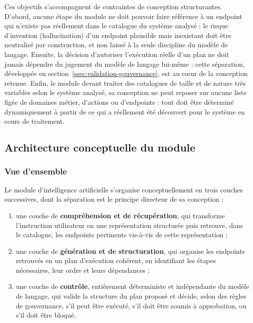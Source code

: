 Ces objectifs s'accompagnent de contraintes de conception structurantes. D'abord, aucune étape du module ne doit pouvoir faire référence à un endpoint qui n'existe pas réellement dans le catalogue du système analysé : le risque d'invention (hallucination) d'un endpoint plausible mais inexistant doit être neutralisé par construction, et non laissé à la seule discipline du modèle de langage. Ensuite, la décision d'autoriser l'exécution réelle d'un plan ne doit jamais dépendre du jugement du modèle de langage lui-même : cette séparation, développée en section~\ref{ssec:validation-gouvernance}, est au cœur de la conception retenue. Enfin, le module devant traiter des catalogues de taille et de nature très variables selon le système analysé, sa conception ne peut reposer sur aucune liste figée de domaines métier, d'actions ou d'endpoints : tout doit être déterminé dynamiquement à partir de ce qui a réellement été découvert pour le système en cours de traitement.

\subsection{Architecture conceptuelle du module}

\subsubsection{Vue d'ensemble}

Le module d'intelligence artificielle s'organise conceptuellement en trois couches successives, dont la séparation est le principe directeur de sa conception :

\begin{enumerate}
    \item une couche de \textbf{compréhension et de récupération}, qui transforme l'instruction utilisateur en une représentation structurée puis retrouve, dans le catalogue, les endpoints pertinents vis-à-vis de cette représentation ;
    \item une couche de \textbf{génération et de structuration}, qui organise les endpoints retrouvés en un plan d'exécution cohérent, en identifiant les étapes nécessaires, leur ordre et leurs dépendances ;
    \item une couche de \textbf{contrôle}, entièrement déterministe et indépendante du modèle de langage, qui valide la structure du plan proposé et décide, selon des règles de gouvernance, s'il peut être exécuté, s'il doit être soumis à approbation, ou s'il doit être bloqué.
\end{enumerate}

